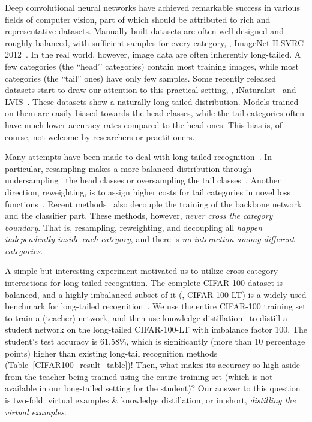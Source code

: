 \documentclass[10pt,twocolumn,letterpaper]{article}
\begin{document}
Deep convolutional neural networks have achieved remarkable success in various fields of computer vision, part of which should be attributed to rich and representative datasets. Manually-built datasets are often well-designed and roughly balanced, with sufficient samples for every category, \eg, ImageNet ILSVRC 2012~\cite{russakovsky2015imagenet}. In the real world, however, image data are often inherently long-tailed. A few categories (the ``head’’ categories) contain most training images, while most categories (the ``tail'' ones) have only few samples. Some recently released datasets start to draw our attention to this practical setting, \eg, iNaturalist~\cite{cui2018large} and LVIS~\cite{gupta2019lvis}. These datasets show a naturally long-tailed distribution. Models trained on them are easily biased towards the head classes, while the tail categories often have much lower accuracy rates compared to the head ones. This bias is, of course, not welcome by researchers or practitioners.

Many attempts have been made to deal with long-tailed recognition~\cite{lin2017focal, cui2019classbalance,cao2019LDAM,zhou2020BBN, kang2019decoupling,jamal2020rethinkingclassbalance}. In particular, resampling makes a more balanced distribution through undersampling~\cite{he2009learning, drummond2003c4} the head classes or oversampling the tail classes~\cite{chawla2002smote, han2005borderline, shen2016relay}. Another direction, reweighting, is to assign higher costs for tail categories in novel loss functions~\cite{cui2019classbalance, tan2020equalization,lin2017focal}. Recent methods~\cite{zhou2020BBN, kang2019decoupling} also decouple the training of the backbone network and the classifier part. These methods, however, \emph{never cross the category boundary}. That is, resampling, reweighting, and decoupling all \emph{happen independently inside each category}, and there is \emph{no interaction among different categories}.

A simple but interesting experiment motivated us to utilize cross-category interactions for long-tailed recognition. The complete CIFAR-100 dataset is balanced, and a highly imbalanced subset of it (\ie, CIFAR-100-LT) is a widely used benchmark for long-tailed recognition~\cite{zhou2020BBN}. We use the entire CIFAR-100 training set to train a (teacher) network, and then use knowledge distillation~\cite{hinton2015distilling} to distill a student network on the long-tailed CIFAR-100-LT with imbalance factor 100. The student’s test accuracy is 61.58\%, which is significantly (more than 10 percentage points)  higher than existing long-tail recognition methods (\cf Table~\ref{CIFAR100_result_table})! Then, what makes its accuracy so high aside from the teacher being trained using the entire training set (which is not available in our long-tailed setting for the student)? Our answer to this question is two-fold: virtual examples \& knowledge distillation, or in short, \emph{distilling the virtual examples}.
\end{document}
